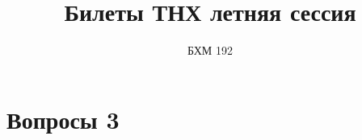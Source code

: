 \documentclass{article}
\title{Билеты ТНХ летняя сессия}
\author{БХМ 192}
\date{}
\begin{document}
\maketitle



\section{Вопросы 3}

























\end{document}
